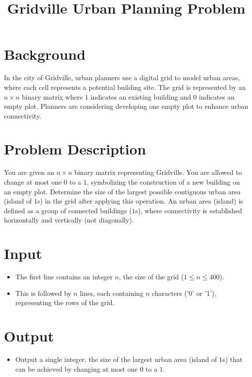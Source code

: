 \documentclass{article}
\title{Gridville Urban Planning Problem}
\author{}
\date{}
\begin{document}
\maketitle

\section*{Background}

In the city of Gridville, urban planners use a digital grid to model urban areas, where each cell represents a potential building site. The grid is represented by an \(n \times n\) binary matrix where \(1\) indicates an existing building and \(0\) indicates an empty plot. Planners are considering developing one empty plot to enhance urban connectivity.

\section*{Problem Description}

You are given an \(n \times n\) binary matrix representing Gridville. You are allowed to change at most one \(0\) to a \(1\), symbolizing the construction of a new building on an empty plot. Determine the size of the largest possible contiguous urban area (island of \(1\)s) in the grid after applying this operation. An urban area (island) is defined as a group of connected buildings (\(1\)s), where connectivity is established horizontally and vertically (not diagonally).

\section*{Input}

\begin{itemize}
    \item The first line contains an integer \(n\), the size of the grid (\(1 \leq n \leq 400\)).
    \item This is followed by \(n\) lines, each containing \(n\) characters ('0' or '1'), representing the rows of the grid.
\end{itemize}

\section*{Output}

\begin{itemize}
    \item Output a single integer, the size of the largest urban area (island of \(1\)s) that can be achieved by changing at most one \(0\) to a \(1\).
\end{itemize}
\end{document}
